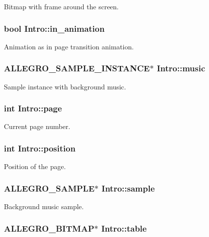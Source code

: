 Bitmap with frame around the screen. \hypertarget{structIntro_a2876fd8a7bfd940c3936eb6445984a22}{
\subsubsection[{in\-\_\-animation}]{\setlength{\rightskip}{0pt plus 5cm}bool Intro\-::in\-\_\-animation}}\label{structIntro_a2876fd8a7bfd940c3936eb6445984a22}
Animation as in page transition animation. \hypertarget{structIntro_a461ce3f44fd4f7d2d3713e2f31c1d1ec}{
\subsubsection[{music}]{\setlength{\rightskip}{0pt plus 5cm}A\-L\-L\-E\-G\-R\-O\-\_\-\-S\-A\-M\-P\-L\-E\-\_\-\-I\-N\-S\-T\-A\-N\-C\-E$\ast$ Intro\-::music}}\label{structIntro_a461ce3f44fd4f7d2d3713e2f31c1d1ec}
Sample instance with background music. \hypertarget{structIntro_aaea1b2d24c0c9a5437c59d727c79ebd1}{
\subsubsection[{page}]{\setlength{\rightskip}{0pt plus 5cm}int Intro\-::page}}\label{structIntro_aaea1b2d24c0c9a5437c59d727c79ebd1}
Current page number. \hypertarget{structIntro_a5c266b2590d4304f92fd3bad033f4375}{
\subsubsection[{position}]{\setlength{\rightskip}{0pt plus 5cm}int Intro\-::position}}\label{structIntro_a5c266b2590d4304f92fd3bad033f4375}
Position of the page. \hypertarget{structIntro_a0189475d44f8e19e6fe543371a9daedb}{
\subsubsection[{sample}]{\setlength{\rightskip}{0pt plus 5cm}A\-L\-L\-E\-G\-R\-O\-\_\-\-S\-A\-M\-P\-L\-E$\ast$ Intro\-::sample}}\label{structIntro_a0189475d44f8e19e6fe543371a9daedb}
Background music sample. \hypertarget{structIntro_a342227f3940dba9ed6b5d3bb4579fd48}{
\subsubsection[{table}]{\setlength{\rightskip}{0pt plus 5cm}A\-L\-L\-E\-G\-R\-O\-\_\-\-B\-I\-T\-M\-A\-P$\ast$ Intro\-::table}}\label{structIntro_a342227f3940dba9ed6b5d3bb4579fd48}
